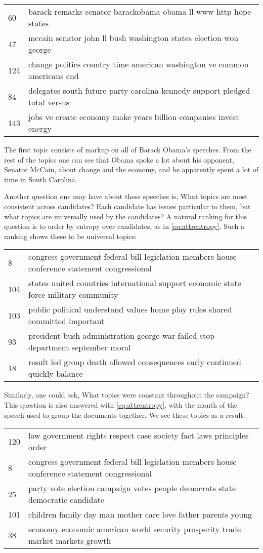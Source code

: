 \documentclass{article}
\begin{document}
\begin{tabular}{l|l}
  60 &  barack remarks senator barackobama obama ll www http hope states\\
  47 & mccain senator john ll bush washington states election won george \\
  124 & change politics country time american washington ve common americans
	end \\
  84 & delegates south future party carolina kennedy support pledged total
	versus \\
  143 & jobs ve create economy make years billion companies invest energy \\
\end{tabular}

The first topic consists of markup on all of Barack Obama's speeches.  From the
rest of the topics one can see that Obama spoke a lot about his opponent,
Senator McCain, about change and the economy, and he apparently spent a lot of
time in South Carolina.

Another question one may have about these speeches is, What topics are most
consistent across candidates?  Each candidate has issues particular to them,
but what topics are universally used by the candidates?  A natural ranking for
this question is to order by entropy over candidates, as in
\eqref{eq:attrentropy}.  Such a ranking shows these to be universal topics:

\begin{tabular}{l|l}
  8 & congress government federal bill legislation members house conference
	statement congressional \\
  104 & states united countries international support economic state force
	military community \\
  103 & public political understand values home play rules shared committed
	important \\
  93 & president bush administration george war failed stop department
	september moral \\
  18 & result led group death allowed consequences early continued quickly
	balance \\
\end{tabular}

Similarly, one could ask, What topics were constant throughout the campaign?
This question is also answered with \eqref{eq:attrentropy}, with the month of
the speech used to group the documents together.  We see these topics as a
result:

\begin{tabular}{l|l}
  120 & law government rights respect case society fact laws principles order \\
  8 & congress government federal bill legislation members house conference
	statement congressional \\
  25 & party vote election campaign votes people democrats state democratic
	candidate \\
  101 & children family day man mother care love father parents young \\
  38 & economy economic american world security prosperity trade market markets
	growth \\
\end{tabular}
\end{document}
